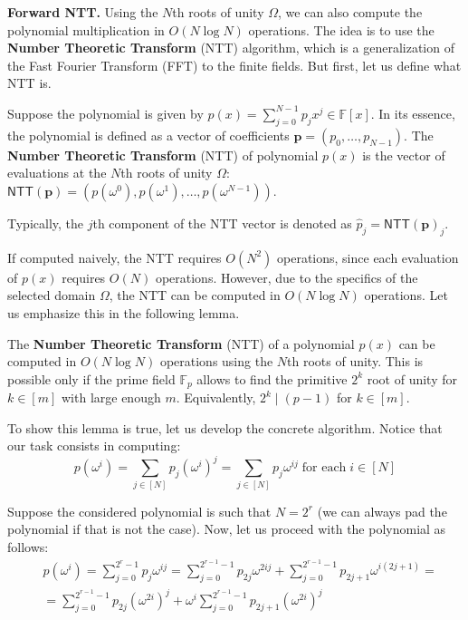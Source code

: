 \documentclass[../lecture-notes.tex]{subfiles}
\begin{document}
\textcolor{blue!60!black}{\textbf{Forward NTT.}} Using the $N$th roots of unity $\Omega$, we can also compute the polynomial
multiplication in $O(N \log N)$ operations. The idea is to use the \textbf{Number
Theoretic Transform} (NTT) algorithm, which is a generalization of the Fast
Fourier Transform (FFT) to the finite fields. But first, let us define 
what NTT is.

\begin{definition}[NTT]
    Suppose the polynomial is given by $p(x) = \sum_{j=0}^{N-1}p_jx^j \in \mathbb{F}[x]$. In its
    essence, the polynomial is defined as a vector of coefficients
    $\boldsymbol{p}=(p_0,\dots,p_{N-1})$. The \textbf{Number Theoretic
    Transform} (NTT) of polynomial $p(x)$ is the vector of evaluations at 
    the $N$th roots of unity $\Omega$:
    $\mathsf{NTT}(\boldsymbol{p}) =
    (p(\omega^0),p(\omega^1),\dots,p(\omega^{N-1}))$.
\end{definition}

\begin{remark}
    Typically, the $j$th component of the NTT vector is denoted as $\hat{p}_j = \mathsf{NTT}(\boldsymbol{p})_j$.
\end{remark}

If computed naively, the NTT requires $O(N^2)$ operations, since each 
evaluation of $p(x)$ requires $O(N)$ operations. However, due to the 
specifics of the selected domain $\Omega$, the NTT can be computed in
$O(N \log N)$ operations. Let us emphasize this in the following lemma.

\begin{lemma}
    The \textbf{Number Theoretic Transform} (NTT) of a polynomial $p(x)$ can be
    computed in $O(N \log N)$ operations using the $N$th roots of unity. This is
    possible only if the prime field $\mathbb{F}_p$ allows to find the primitive
    $2^k$ root of unity for $k \in [m]$ with large enough $m$. Equivalently, 
    $2^k \mid (p-1)$ for $k \in [m]$.
\end{lemma}

To show this lemma is true, let us develop the concrete algorithm. Notice that 
our task consists in computing:
\begin{equation*}
    p(\omega^i) = \sum_{j \in [N]} p_j (\omega^i)^j = \sum_{j \in [N]} p_j \omega^{ij} \; \text{for each} \; i \in [N]
\end{equation*}

Suppose the considered polynomial is such that $N=2^r$ (we can always pad the
polynomial if that is not the case). Now, let us proceed with the polynomial as
follows:
\begin{equation*}
    \begin{aligned}
        &p(\omega^i) = \sum_{j=0}^{2^{r}-1}p_j\omega^{ij} = \sum_{j=0}^{2^{r-1}-1}p_{2j}\omega^{2ij} + \sum_{j=0}^{2^{r-1}-1}p_{2j+1}\omega^{i(2j+1)} = \\
        &= \sum_{j=0}^{2^{r-1}-1}p_{2j}(\omega^{2i})^j + \omega^i\sum_{j=0}^{2^{r-1}-1}p_{2j+1} (\omega^{2i})^j
    \end{aligned}
\end{equation*}
\end{document}
